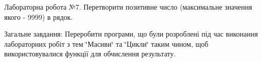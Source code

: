 Лабораторна робота №7. Перетворити позитивне число (максимальне значення якого -\/ 9999) в рядок.

Загальне завдання\+: Переробити програми, що були розроблені під час виконання лабораторних робіт з тем \char`\"{}Масиви\char`\"{} та \char`\"{}Цикли\char`\"{} таким чином, щоб використовувалися функції для обчислення результату. 